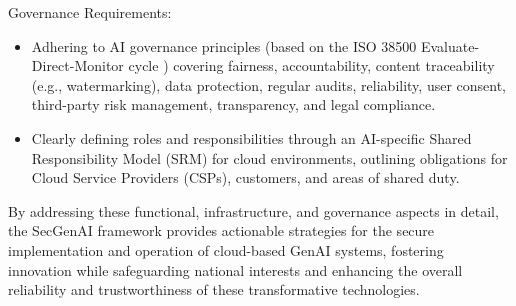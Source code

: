Governance Requirements:
\begin{itemize}
    \item Adhering to AI governance principles (based on the ISO 38500 Evaluate-Direct-Monitor cycle \cite{noauthor_isoiec_nodate}) covering fairness, accountability, content traceability (e.g., watermarking), data protection, regular audits, reliability, user consent, third-party risk management, transparency, and legal compliance\cite{haryanto_secgenai_2024}.
    \item Clearly defining roles and responsibilities through an AI-specific Shared Responsibility Model (SRM) for cloud environments, outlining obligations for Cloud Service Providers (CSPs), customers, and areas of shared duty\cite{haryanto_secgenai_2024}.
\end{itemize}
By addressing these functional, infrastructure, and governance aspects in detail, the SecGenAI framework provides actionable strategies for the secure implementation and operation of cloud-based GenAI systems, fostering innovation while safeguarding national interests and enhancing the overall reliability and trustworthiness of these transformative technologies\cite{haryanto_secgenai_2024}.

